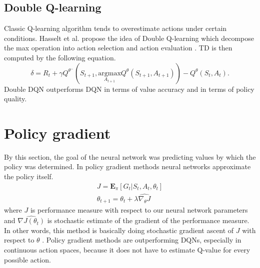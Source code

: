 \subsection{Double Q-learning}
Classic Q-learning algorithm tends to overestimate actions under certain conditions. Hasselt et al. propose the idea of Double Q-learning which decompose the max operation into action selection and action evaluation \cite{hasselt2015}. TD is then computed by the following equation.
\begin{equation}
\delta = R_{t} + \gamma Q^{\theta^-}(S_{t+1}, \underset{A_{t+1}}{\text{argmax}}Q^\theta(S_{t+1}, A_{t+1})) - Q^\theta (S_t, A_t).
\end{equation}
Double DQN outperforms DQN in terms of value accuracy and in terms of policy quality.

\clearpage
\section{Policy gradient}
By this section, the goal of the neural network was predicting values by which the policy was determined. In policy gradient methods neural networks approximate the policy itself. 
\begin{align}
J = \mathbf{E}_\pi[G_t | S_t, A_t, \theta_t] \\
\theta_{t+1} = \theta_t + \lambda \widehat{\nabla_\theta J}
\end{align}
where $J$ is performance measure with respect to our neural network parameters and $\widehat{\nabla J(\theta_t)}$ is stochastic estimate of the gradient of the performance measure. In other words, this method is basically doing stochastic gradient ascent of $J$ with respect to $\theta$ \cite{sutton1999}. Policy gradient methods are outperforming DQNs, especially in continuous action spaces, because it does not have to estimate Q-value for every possible action.

